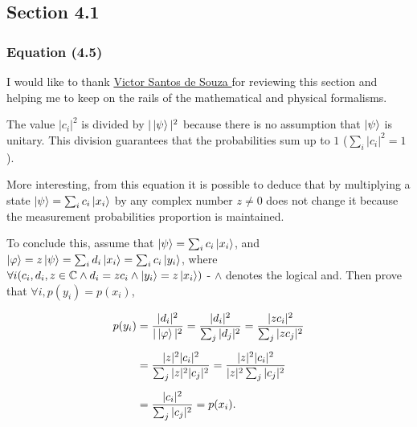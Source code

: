 \subsection{Section 4.1}
\label{sec:noson-section-4-1}

\subsubsection{Equation (4.5)}
\label{sec:noson-equation-4-5}

I would like to thank \href{http://lattes.cnpq.br/0162506805992681}{
    Victor Santos de Souza
}
for reviewing this section and helping me to keep on the rails of
the mathematical and physical formalisms.

The value $|c_i|^2$ is divided by $|\ket\psi|^2$ because
there is no assumption that $\ket\psi$ is unitary.
This division guarantees that the probabilities sum up to $1$
($\sum_i |c_i|^2 = 1$).

More interesting, from this equation it is possible to deduce that
by multiplying a state $\ket\psi = \sum_i c_i \ket{x_i}$ by
any complex number $z \neq 0$ does not change it
because the measurement probabilities proportion is maintained.

To conclude this, assume that $\ket\psi = \sum_i c_i \ket{x_i}$, and
$\ket\varphi = z \ket\psi = \sum_i d_i \ket{x_i} = \sum_i c_i \ket{y_i}$,
where $\forall i (c_i, d_i, z \in \mathbb{C} \land
d_i = z c_i \land \ket{y_i} = z \ket{x_i})$ -
$\land$ denotes the logical and.
Then prove that $\forall i, p(y_i) = p(x_i)$,

\begin{align}
    p(y_i) &= \frac{|d_i|^2}{|\ket\varphi|^2}
        = \frac{|d_i|^2}{\sum_j|d_j|^2}
        = \frac{|z c_i|^2}{\sum_j|z c_j|^2} 
        \\[5pt]
        &= \frac{|z|^2 |c_i|^2}{\sum_j|z|^2 |c_j|^2}
        = \frac{|z|^2 |c_i|^2}{|z|^2 \sum_j |c_j|^2}
        \\[5pt]
        &= \frac{|c_i|^2}{\sum_j |c_j|^2}
        = p(x_i) .
\end{align}

